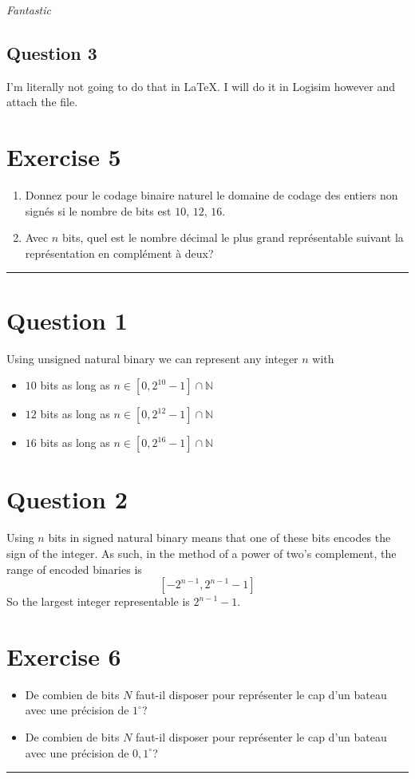 \documentclass[a4paper,10pt]{article}
\def\centralruler{\begin{center}\rule{5cm}{.1pt}\end{center}}
\newcommand{\N}{\mathbb{N}}
\begin{document}
\textit{Fantastic}

\subsection{Question 3}
I'm literally not going to do that in LaTeX. I will do it in Logisim however and attach the file.

\section{Exercise 5}
\begin{enumerate}
	\item Donnez pour le codage binaire naturel le domaine de codage des entiers non signés si le nombre de bits est $10$, $12$, $16$.
	\item Avec $n$ bits, quel est le nombre décimal le plus grand représentable suivant la représentation en complément à deux?
\end{enumerate}

\centralruler

\section{Question 1}
Using unsigned natural binary we can represent any integer $n$ with
\begin{itemize}
	\item $10$ bits as long as $n\in\left[0,2^{10}-1\right]\cap\N$
	\item $12$ bits as long as $n\in\left[0,2^{12}-1\right]\cap\N$
	\item $16$ bits as long as $n\in\left[0,2^{16}-1\right]\cap\N$
\end{itemize}

\section{Question 2}
Using $n$ bits in signed natural binary means that one of these bits encodes the sign of the integer. As such, in the method of a power of two's complement, the range of encoded binaries is
\[
	\left[-2^{n-1},2^{n-1}-1\right]
\]
So the largest integer representable is $2^{n-1}-1$.

\section{Exercise 6}
\begin{itemize}
	\item De combien de bits $N$ faut-il disposer pour représenter le cap d'un bateau avec une précision de $1^\circ$?
	\item De combien de bits $N$ faut-il disposer pour représenter le cap d'un bateau avec une précision de $0,1^\circ$?
\end{itemize}
\centralruler{}
\end{document}
